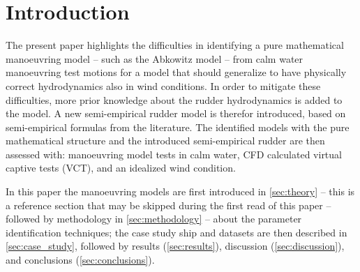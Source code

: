 \section{Introduction}
\label{sec:introduction}



The present paper highlights the difficulties in identifying a pure mathematical manoeuvring model -- such as the Abkowitz model -- from calm water manoeuvring test motions for a model that should generalize to have physically correct hydrodynamics also in wind conditions. In order to mitigate these difficulties, more prior knowledge about the rudder hydrodynamics is added to the model. A new semi-empirical rudder model is therefor introduced, based on semi-empirical formulas from the literature. The identified models with the pure mathematical structure and the introduced semi-empirical rudder are then assessed with: manoeuvring model tests in calm water, CFD calculated virtual captive tests (VCT), and an idealized wind condition.

In this paper the manoeuvring models are first introduced in \autoref{sec:theory} -- this is a reference section that may be skipped during the first read of this paper -- followed by methodology in \autoref{sec:methodology} -- about the parameter identification techniques; the case study ship and datasets are then described in \autoref{sec:case_study}, followed by results (\autoref{sec:results}), discussion (\autoref{sec:discussion}), and conclusions (\autoref{sec:conclusions}).
